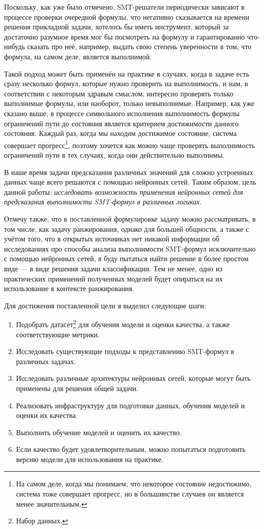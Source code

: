 
Поскольку, как уже было отмечено, SMT-решатели периодически зависают в процессе проверки очередной формулы, что негативно сказывается на времени решения прикладной задачи, хотелось бы иметь инструмент, который за достаточно разумное время мог бы посмотреть на формулу и гарантированно что-нибудь сказать про неё, например, выдать свою степень уверенности в том, что формула, на самом деле, является выполнимой.

Такой подход может быть применён на практике в случаях, когда в задаче есть сразу несколько формул, которые нужно проверить на выполнимость, и нам, в соответствии с некоторым здравым смыслом, интересно проверять только выполнимые формулы, или наоборот, только невыполнимые. Например, как уже сказано выше, в процессе символьного исполнения выполнимость формулы ограничений пути до состояния является критерием достижимости данного состояния. Каждый раз, когда мы находим достижимое состояние, система совершает прогресс\footnote{На самом деле, когда мы понимаем, что некоторое состояние недостижимо, система тоже совершает прогресс, но в большинстве случаев он является менее значительным.}, поэтому хочется как можно чаще проверять выполнимость ограничений пути в тех случаях, когда они действительно выполнимы.

В наше время задачи предсказания различных значений для сложно устроенных данных чаще всего решаются с помощью нейронных сетей. Таким образом, цель данной работы: \textit{исследовать возможность применения нейронных сетей для предсказания выполнимости SMT-формул в различных логиках}.

Отмечу также, что в поставленной формулировке задачу можно рассматривать, в том числе, как задачу ранжирования, однако для большей общности, а также с учётом того, что в открытых источниках нет никакой информации об исследованиях про способы анализа выполнимости SMT-формул исключительно с помощью нейронных сетей, я буду пытаться найти решение в более простом виде --- в виде решения задачи классификации. Тем не менее, одно из практических применений полученных моделей будет опираться на их использование в контексте ранжирования.

Для достижения поставленной цели я выделил следующие шаги:

\begin{enumerate}
    \item Подобрать датасет\footnote{Набор данных.} для обучения модели и оценки качества, а также соответствующие метрики.
    \item Исследовать существующие подходы к представлению SMT-формул в различных задачах.
    \item Исследовать различные архитектуры нейронных сетей, которые могут быть применены для решения общей задачи.
    \item Реализовать инфраструктуру для подготовки данных, обучения моделей и оценки их качества.
    \item Выполнить обучение моделей и оценить их качество.
    \item Если качество будет удовлетворительным, можно попытаться подготовить версию модели для использования на практике.
\end{enumerate}
